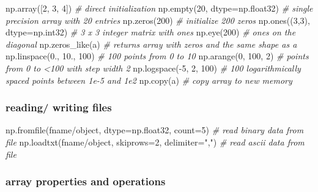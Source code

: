 \documentclass[]{article}
\newenvironment{Shaded}{}{}
\newcommand{\DataTypeTok}[1]{\textcolor[rgb]{0.56,0.13,0.00}{{#1}}}
\newcommand{\DecValTok}[1]{\textcolor[rgb]{0.25,0.63,0.44}{{#1}}}
\newcommand{\StringTok}[1]{\textcolor[rgb]{0.25,0.44,0.63}{{#1}}}
\newcommand{\CommentTok}[1]{\textcolor[rgb]{0.38,0.63,0.69}{\textit{{#1}}}}
\newcommand{\NormalTok}[1]{{#1}}
\begin{document}
\begin{Shaded}
\begin{Highlighting}[]
\NormalTok{np.array([}\DecValTok{2}\NormalTok{, }\DecValTok{3}\NormalTok{, }\DecValTok{4}\NormalTok{]) }\CommentTok{# direct initialization}
\NormalTok{np.empty(}\DecValTok{20}\NormalTok{, dtype=np.float32) }\CommentTok{# single precision array with 20 entries}
\NormalTok{np.zeros(}\DecValTok{200}\NormalTok{) }\CommentTok{# initialize 200 zeros}
\NormalTok{np.ones((}\DecValTok{3}\NormalTok{,}\DecValTok{3}\NormalTok{), dtype=np.int32) }\CommentTok{# 3 x 3 integer matrix with ones}
\NormalTok{np.eye(}\DecValTok{200}\NormalTok{) }\CommentTok{# ones on the diagonal}
\NormalTok{np.zeros_like(a) }\CommentTok{# returns array with zeros and the same shape as a}
\NormalTok{np.linspace(}\DecValTok{0}\NormalTok{., }\DecValTok{10}\NormalTok{., }\DecValTok{100}\NormalTok{) }\CommentTok{# 100 points from 0 to 10}
\NormalTok{np.arange(}\DecValTok{0}\NormalTok{, }\DecValTok{100}\NormalTok{, }\DecValTok{2}\NormalTok{) }\CommentTok{# points from 0 to <100 with step width 2}
\NormalTok{np.logspace(-}\DecValTok{5}\NormalTok{, }\DecValTok{2}\NormalTok{, }\DecValTok{100}\NormalTok{) }\CommentTok{# 100 logarithmically spaced points between 1e-5 and 1e2}
\NormalTok{np.copy(a) }\CommentTok{# copy array to new memory}
\end{Highlighting}
\end{Shaded}

\subsubsection{reading/ writing files}

\begin{Shaded}
\begin{Highlighting}[]
\NormalTok{np.fromfile(fname/}\DataTypeTok{object}\NormalTok{, dtype=np.float32, count=}\DecValTok{5}\NormalTok{) }\CommentTok{# read binary data from file}
\NormalTok{np.loadtxt(fname/}\DataTypeTok{object}\NormalTok{, skiprows=}\DecValTok{2}\NormalTok{, delimiter=}\StringTok{","}\NormalTok{) }\CommentTok{# read ascii data from file}
\end{Highlighting}
\end{Shaded}

\subsubsection{array properties and operations}
\end{document}

